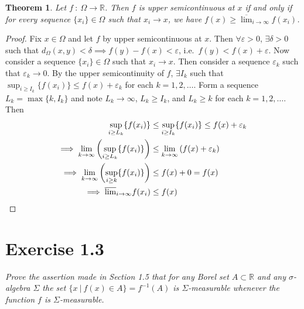 \documentclass[12pt]{article}
\theoremstyle{plain}
\newtheorem{theorem}{Theorem}
\begin{document}
\begin{theorem}
    Let $f\ :\ \Omega \rightarrow \mathbb{R}$.  Then $f$ is upper semicontinuous at $x$ if and only if for every sequence $\{x_i\} \in \Omega$ such that $x_i \rightarrow x$, we have $f(x) \geq \overline{\lim}_{i\rightarrow \infty}f(x_i)$.
\end{theorem}
\begin{proof}
    Fix $x \in \Omega$ and let $f$ by upper semicontinuous at $x$.  Then $\forall \varepsilon > 0$, $\exists \delta > 0$ such that $d_\Omega(x, y) < \delta \implies f(y) - f(x) < \varepsilon$, i.e.~$f(y) < f(x) + \varepsilon$.  Now consider a sequence $\{x_i\} \in \Omega$ such that $x_i \rightarrow x$.  Then consider a sequence $\varepsilon_k$ such that $\varepsilon_k \rightarrow 0$.  By the upper semicontinuity of $f$, $\exists I_k$ such that $\sup_{i \geq I_k}\{f(x_i)\} \leq f(x) + \varepsilon_k$ for each $k = 1, 2, \dots$.  Form a sequence $L_k = \max\{k, I_k\}$ and note $L_k \rightarrow \infty$, $L_k \geq I_k$, and $L_k \geq k$ for each $k = 1, 2, \dots$.  Then
    \begin{align*}
        \sup_{i \geq L_k}\{f(x_i)\} &\leq \sup_{i \geq I_k}\{f(x_i)\} \leq f(x) + \varepsilon_k \\
        \implies \lim_{k \rightarrow \infty}\qty(\sup_{i \geq L_k}\{f(x_i)\}) &\leq \lim_{k \rightarrow \infty} \qty(f(x) + \varepsilon_k) \\
        \implies \lim_{k \rightarrow \infty}\qty(\sup_{i \geq k}\{f(x_i)\}) &\leq f(x) + 0 = f(x) \\
        \implies \overline{\lim}_{i \rightarrow \infty} f(x_i) &\leq f(x)
    \end{align*}
\end{proof}

\section*{Exercise 1.3}
\textit{Prove the assertion made in Section 1.5 that for any Borel set $A \subset \mathbb{R}$ and any $\sigma$-algebra $\Sigma$ the set $\{x\ |\ f(x) \in A\} = f^{-1}(A)$ is $\Sigma$-measurable whenever the function $f$ is $\Sigma$-measurable.}
\end{document}
